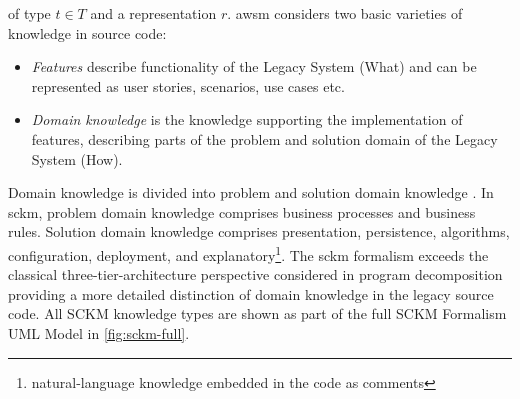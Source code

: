 of type \(t \in T\) and a representation \(r\).
%
\gls{awsm} considers two basic varieties of knowledge in  source code:
\begin{itemize}
\item \emph{Features} describe functionality of the \gls{Legacy System} (What) and can be represented as user stories, scenarios, use cases etc.
\item \emph{Domain knowledge} is the knowledge supporting the implementation of features, describing parts of the problem and solution domain of the \gls{Legacy System} (How).
\end{itemize}
Domain knowledge is divided into problem and solution domain knowledge \autocite{Marcus2004ProblemLocation}.
In \gls{sckm}, problem domain knowledge comprises business processes and business rules.
Solution domain knowledge comprises presentation, persistence, algorithms, configuration, deployment, and explanatory\footnote{natural-language knowledge embedded in the code as comments}.
The \gls{sckm} formalism exceeds the classical three-tier-architecture perspective considered in program decomposition providing a more detailed distinction of domain knowledge in the legacy source code.
All SCKM knowledge types are shown as part of the full SCKM Formalism UML Model in \cref{fig:sckm-full}.


